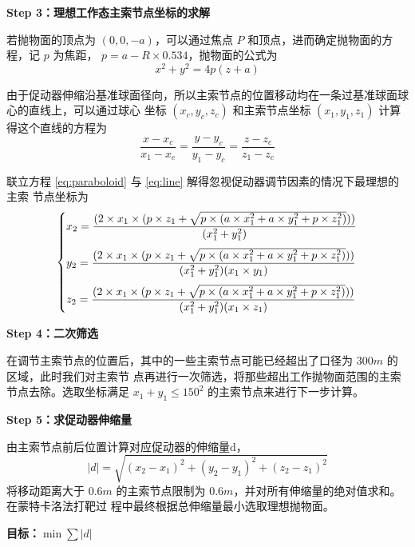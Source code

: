 \documentclass[withoutpreface,bwprint]{cumcmthesis} %
\begin{document}
\textbf{Step 3：理想工作态主索节点坐标的求解}

若抛物面的顶点为 $(0,0,-a)$，可以通过焦点 $P$ 和顶点，进而确定抛物面的方程，记 $p$ 为焦距，
$p = a-R \times 0.534$，抛物面的公式为
\begin{equation}
    \label{eq:paraboloid}
    x^2 + y^2 = 4p(z + a)
\end{equation}

由于促动器伸缩沿基准球面径向，所以主索节点的位置移动均在一条过基准球面球心的直线上，可以通过球心
坐标 $(x_c,y_c,z_c)$ 和主索节点坐标 $(x_1,y_1,z_1)$ 计算得这个直线的方程为
\begin{equation}
    \label{eq:line}
    \frac{\displaystyle x - x_c}{\displaystyle x_1 - x_c} = \frac{\displaystyle y - y_c}
    {\displaystyle y_1 - y_c} = \frac{\displaystyle z - z_c}{\displaystyle z_1 - z_c}
\end{equation}

联立方程 \eqref{eq:paraboloid} 与 \eqref{eq:line} 解得忽视促动器调节因素的情况下最理想的主索
节点坐标为
\[
\begin{dcases}
    \smallskip
    x_2 = \frac{(2\times x_1\times (p\times z_1 + \sqrt{p\times (a\times x_1^2 + a\times
    y_1^2 + p\times z_1^2)}))}{(x_1^2 + y_1^2)}  \\
    \smallskip
    y_2 = \frac{(2\times x_1\times (p\times z_1 + \sqrt{p\times (a\times x_1^2 + a\times
    y_1^2 + p\times z_1^2)}))}{(x_1^2 + y_1^2)(x_1 \times y_1)}  \\
    z_2 = \frac{(2\times x_1\times (p\times z_1 + \sqrt{p\times (a\times x_1^2 + a\times
    y_1^2 + p\times z_1^2)}))}{(x_1^2 + y_1^2)(x_1 \times z_1)}  \\
\end{dcases}
\]

\textbf{Step 4：二次筛选}

在调节主索节点的位置后，其中的一些主索节点可能已经超出了口径为 $300m$ 的区域，此时我们对主索节
点再进行一次筛选，将那些超出工作抛物面范围的主索节点去除。选取坐标满足 $x_1 + y_1 \leqslant  150^2$
的主索节点来进行下一步计算。

\textbf{Step 5：求促动器伸缩量}

由主索节点前后位置计算对应促动器的伸缩量d，
\[
    |d| = \sqrt{(x_2-x_1)^2 + (y_2-y_1)^2 + (z_2-z_1)^2}
\]
将移动距离大于 $0.6m$ 的主索节点限制为 $0.6m$，并对所有伸缩量的绝对值求和。在蒙特卡洛法打靶过
程中最终根据总伸缩量最小选取理想抛物面。

\medskip
\textbf{目标：$\min\sum |d|$}
\end{document}

